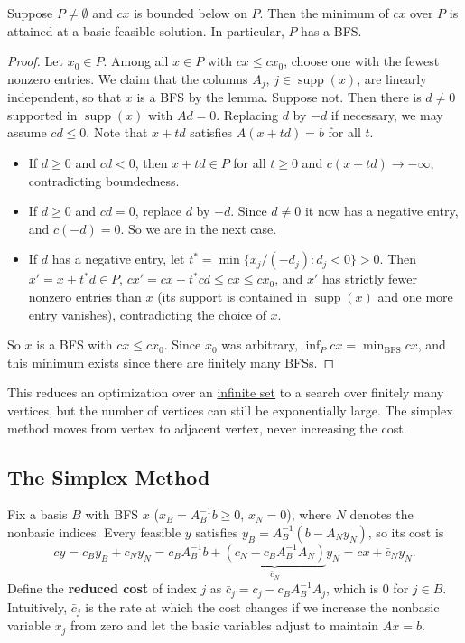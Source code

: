 	\begin{theorem}
	  \label{thm:fundamental-theorem-of-linear-programming}
		Suppose $P \neq \emptyset$ and $cx$ is bounded below on $P$. Then the minimum of $cx$ over $P$ is attained at a basic feasible solution. In particular, $P$ has a BFS. 
	\end{theorem}
	\begin{proof}
		Let $x_0 \in P$. Among all $x \in P$ with $cx \leq cx_0$, choose one with the fewest nonzero entries. We claim that the columns $A_j$, $j \in \operatorname{supp}(x)$, are linearly independent, so that $x$ is a BFS by the lemma. Suppose not. Then there is $d \neq 0$ supported in $\operatorname{supp}(x)$ with $Ad = 0$. Replacing $d$ by $-d$ if necessary, we may assume $cd \leq 0$. Note that $x + td$ satisfies $A(x + td) = b$ for all $t$. 
		\begin{itemize}
			\item If $d \geq 0$ and $cd < 0$, then $x + td \in P$ for all $t \geq 0$ and $c(x + td) \to -\infty$, contradicting boundedness. 
			\item If $d \geq 0$ and $cd = 0$, replace $d$ by $-d$. Since $d \neq 0$ it now has a negative entry, and $c(-d) = 0$. So we are in the next case. 
			\item If $d$ has a negative entry, let $t^\ast = \min\{ x_j / (-d_j) \colon d_j < 0\} > 0$. Then $x' = x + t^\ast d \in P$, $cx' = cx + t^\ast cd \leq cx \leq cx_0$, and $x'$ has strictly fewer nonzero entries than $x$ (its support is contained in $\operatorname{supp}(x)$ and one more entry vanishes), contradicting the choice of $x$. 
		\end{itemize}
		So $x$ is a BFS with $cx \leq cx_0$. Since $x_0$ was arbitrary, $\inf_P cx = \min_{\text{BFS}} cx$, and this minimum exists since there are finitely many BFSs. 
	\end{proof}

	This reduces an optimization over an \hyperref[st-def:infinite-set]{infinite set} to a search over finitely many vertices, but the number of vertices can still be exponentially large. The simplex method moves from vertex to adjacent vertex, never increasing the cost. 

\subsection{The Simplex Method}

	Fix a basis $B$ with BFS $x$ ($x_B = A_B^{-1} b \geq 0$, $x_N = 0$), where $N$ denotes the nonbasic indices. Every feasible $y$ satisfies $y_B = A_B^{-1}(b - A_N y_N)$, so its cost is 
	\begin{equation}
		cy = c_B y_B + c_N y_N = c_B A_B^{-1} b + \underbrace{(c_N - c_B A_B^{-1} A_N)}_{\bar c_N} y_N = cx + \bar c_N y_N. 
	\end{equation}
	Define the \textbf{reduced cost} of index $j$ as $\bar c_j = c_j - c_B A_B^{-1} A_j$, which is $0$ for $j \in B$. Intuitively, $\bar c_j$ is the rate at which the cost changes if we increase the nonbasic variable $x_j$ from zero and let the basic variables adjust to maintain $Ax = b$. 

